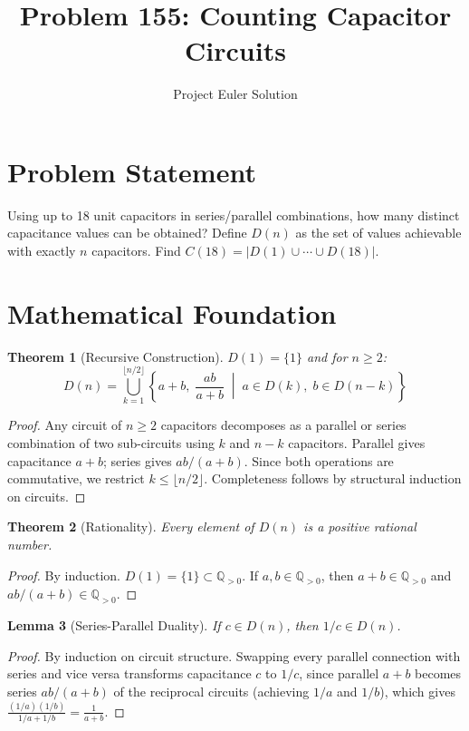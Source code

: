 \documentclass[12pt]{article}
\title{Problem 155: Counting Capacitor Circuits}
\author{Project Euler Solution}
\date{}
\newtheorem{theorem}{Theorem}
\newtheorem{lemma}[theorem]{Lemma}
\begin{document}
\maketitle

\section{Problem Statement}
Using up to 18 unit capacitors in series/parallel combinations, how many distinct capacitance values can be obtained? Define $D(n)$ as the set of values achievable with exactly $n$ capacitors. Find $C(18) = |D(1) \cup \cdots \cup D(18)|$.

\section{Mathematical Foundation}

\begin{theorem}[Recursive Construction]
$D(1) = \{1\}$ and for $n \ge 2$:
\[
D(n) = \bigcup_{k=1}^{\lfloor n/2 \rfloor} \left\{ a + b,\; \frac{ab}{a+b} \;\middle|\; a \in D(k),\; b \in D(n-k) \right\}
\]
\end{theorem}

\begin{proof}
Any circuit of $n \ge 2$ capacitors decomposes as a parallel or series combination of two sub-circuits using $k$ and $n-k$ capacitors. Parallel gives capacitance $a + b$; series gives $ab/(a+b)$. Since both operations are commutative, we restrict $k \le \lfloor n/2 \rfloor$. Completeness follows by structural induction on circuits.
\end{proof}

\begin{theorem}[Rationality]
Every element of $D(n)$ is a positive rational number.
\end{theorem}

\begin{proof}
By induction. $D(1) = \{1\} \subset \mathbb{Q}_{>0}$. If $a, b \in \mathbb{Q}_{>0}$, then $a + b \in \mathbb{Q}_{>0}$ and $ab/(a+b) \in \mathbb{Q}_{>0}$.
\end{proof}

\begin{lemma}[Series-Parallel Duality]
If $c \in D(n)$, then $1/c \in D(n)$.
\end{lemma}

\begin{proof}
By induction on circuit structure. Swapping every parallel connection with series and vice versa transforms capacitance $c$ to $1/c$, since parallel $a + b$ becomes series $ab/(a+b)$ of the reciprocal circuits (achieving $1/a$ and $1/b$), which gives $\frac{(1/a)(1/b)}{1/a + 1/b} = \frac{1}{a+b}$.
\end{proof}
\end{document}
